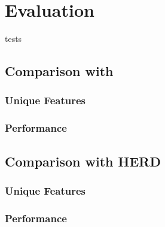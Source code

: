 \chapter{Evaluation}
\label{ch:eval}

tests


\section{Comparison with \porthos{}}

\subsection{Unique Features}
\subsection{Performance}




\section{Comparison with HERD}

\subsection{Unique Features}
\subsection{Performance}

